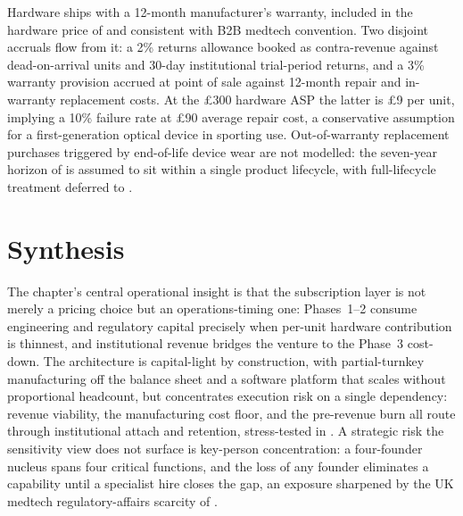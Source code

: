 Hardware ships with a 12-month manufacturer's warranty, included in the hardware price of  and consistent with B2B medtech convention. Two disjoint accruals flow from it: a 2\% returns allowance booked as contra-revenue against dead-on-arrival units and 30-day institutional trial-period returns, and a 3\% warranty provision accrued at point of sale against 12-month repair and in-warranty replacement costs. At the \pounds300 hardware ASP the latter is \pounds9 per unit, implying a 10\% failure rate at \pounds90 average repair cost, a conservative assumption for a first-generation optical device in sporting use. Out-of-warranty replacement purchases triggered by end-of-life device wear are not modelled: the seven-year horizon of  is assumed to sit within a single product lifecycle, with full-lifecycle treatment deferred to .


\section{Synthesis}
\label{sec:ent-business-synthesis}

The chapter's central operational insight is that the subscription layer is not merely a pricing choice but an operations-timing one: Phases~1--2 consume engineering and regulatory capital precisely when per-unit hardware contribution is thinnest, and institutional revenue bridges the venture to the Phase~3 cost-down. The architecture is capital-light by construction, with partial-turnkey manufacturing off the balance sheet and a software platform that scales without proportional headcount, but concentrates execution risk on a single dependency: revenue viability, the manufacturing cost floor, and the pre-revenue burn all route through institutional attach and retention, stress-tested in . A strategic risk the sensitivity view does not surface is key-person concentration: a four-founder nucleus spans four critical functions, and the loss of any founder eliminates a capability until a specialist hire closes the gap, an exposure sharpened by the UK medtech regulatory-affairs scarcity of .
